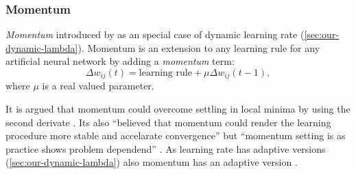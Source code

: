 \subsubsection{Momentum}
\label{sec:our-momentum}

\emph{Momentum} introduced by \citet{jacobs1988increased} as an special case of dynamic learning rate (\ref{sec:our-dynamic-lambda}). Momentum is an extension to any learning rule for any artificial neural network by adding a \emph{momentum} term: 
\begin{equation} 
  \Delta w_{ij}(t) = \mbox{learning rule} + \mu \Delta w_{ij}(t-1), \nonumber
\end{equation} 
where $\mu$ is a real valued parameter. 

It is argued that momentum could overcome settling in local minima by using the second derivate  \citep{phansalkar1994analysis}. Its also \enquote{believed that momentum could render the learning procedure more stable and accelarate convergence} but \enquote{momentum setting is as practice shows problem dependend} \citep{riedmiller1993direct}. As learning rate has adaptive versions (\ref{sec:our-dynamic-lambda}) also momentum has an adaptive version \citep{miniani1990acceleration}. 
